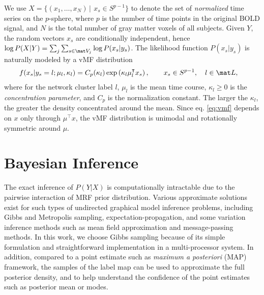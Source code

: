 \documentclass[review,authoryear]{elsarticle}
\begin{document}
We use $ X = \{ (x_1, \dots, x_N)\, |\, \ x_s \in S^{p-1} \}$ to denote the set
of \emph{normalized} time series on the $p$-sphere, where $p$ is the number of time
points in the original BOLD signal, and $N$ is the total number of gray matter
voxels of all subjects. Given $Y$, the random vectors $ x_s$ are conditionally
independent, hence $\log P( X | Y) = \sum_j \sum_{s \in \mat V_j} \log P (x_s | y_s)$.
The likelihood function $P( x_s | y_s)$ is naturally modeled by a vMF
distribution
\begin{align}
 f ( x_s| y_s = l; \mu_l, \kappa_l) &= C_p(\kappa_l) \exp \left(\kappa_l  \mu_l^{\intercal} x_s\right), \qquad  x_s \in S^{p-1},  \quad  l \in {\mat L},\label{eq:vmf}
\end{align}
where for the network cluster label $l$, $\mu_l$ is the mean time course,
$\kappa_l \geq 0$ is the \emph{concentration parameter}, and $C_p$ is the
normalization constant. The larger the $\kappa_l$, the greater the density
concentrated around the mean. Since eq. \eqref{eq:vmf} depends on $x$ only through
$\mu^{\intercal} x$, the vMF distribution is unimodal and rotationally symmetric around
$\mu$.

\section{Bayesian Inference}
\label{sec:inference}
The exact inference of $P(Y|X)$ is computationally intractable due to the
pairwise interaction of MRF prior distribution. Various approximate solutions
exist for such types of undirected graphical model inference problems, including
Gibbs and Metropolis sampling, expectation-propagation, and some variation
inference methods such as mean field approximation and message-passing
methods. In this work, we choose Gibbs sampling because of its simple
formulation and straightforward implementation in a multi-processor system. In
addition, compared to a point estimate such as \emph{maximum a posteriori} (MAP)
framework, the samples of the label map can be used to approximate the full
posterior density, and to help understand the confidence of the point estimates
such as posterior mean or modes.
\end{document}
